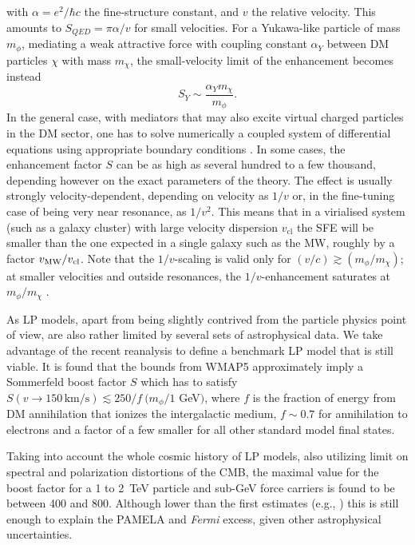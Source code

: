 \documentclass[10pt,aps,pra,reprint,amsmath,amsfonts,amssymb,showpacs,nofootinbib,floatfix]{revtex4-1}
\newcommand{\Fermi}{{\em Fermi}\xspace}
\newcommand{\rmn}{\mathrm}
\newcommand{\sigv}{v_\rmn{cl}}
\begin{document}
with $\alpha =e^2/\hbar c$ the fine-structure constant, and $v$ the relative
velocity. This amounts to $S_{QED}=\pi\alpha/v$ for small velocities. For a
Yukawa-like particle of mass $m_\phi$, mediating a weak attractive force with
coupling constant $\alpha_Y$ between DM particles $\chi$ with mass
$m_\chi$, the small-velocity limit of the enhancement becomes instead
\begin{equation}
S_Y\sim\frac{\alpha_Y m_\chi}{m_\phi}.
\label{eq:saturation}
\end{equation}
In the general case, with mediators that may also excite virtual
charged particles in the DM sector, one has to solve numerically a
coupled system of differential equations using appropriate boundary
conditions
\cite{2005PhRvD..71f3528H,2007NuPhB.787..152C,2009PhRvD..79a5014A}. In
some cases, the enhancement factor $S$ can be as high as several
hundred to a few thousand, depending however on the exact parameters
of the theory. The effect is usually strongly velocity-dependent,
depending on velocity as $1/v$ or, in the fine-tuning case of being
very near resonance, as $1/v^2$. This means that in a virialised
system (such as a galaxy cluster) with large velocity dispersion
$\sigv$ the SFE will be smaller than the one expected in a single
galaxy such as the MW, roughly by a factor $v_{\rm MW}/\sigv$. Note
that the $1/v$-scaling is valid only for $(v/c) \gtrsim
(m_\phi/m_\chi)$; at smaller velocities and outside resonances, the
$1/v$-enhancement saturates at $m_\phi/m_\chi$
\cite{2008PhRvL.101z1301K}.

As LP models, apart from being slightly contrived from the particle
physics point of view, are also rather limited by several sets of
astrophysical data. We take advantage of the recent reanalysis
\cite{Finkbeiner:2010sm} to define a benchmark LP model that is still
viable. It is found that the bounds from WMAP5 approximately imply a
Sommerfeld boost factor $S$ which has to satisfy $S(v\to
150\,\rmn{km}/\rmn{s})\lesssim 250/f\ (m_\phi/1$ GeV$)$, where $f$ is
the fraction of energy from DM annihilation that ionizes the
intergalactic medium, $f\sim 0.7$ for annihilation to electrons and a
factor of a few smaller for all other standard model final states.

Taking into account the whole cosmic history of LP models, also
utilizing limit on spectral and polarization distortions of the CMB,
the maximal value for the boost factor for a 1 to 2~TeV particle and
sub-GeV force carriers is found to be \cite{Finkbeiner:2010sm} between
400 and 800. Although lower than the first estimates (e.g.,
\cite{Bergstrom:2009fa,Meade:2009iu}) this is still enough to explain
the PAMELA and \Fermi excess, given other astrophysical uncertainties.
\end{document}
